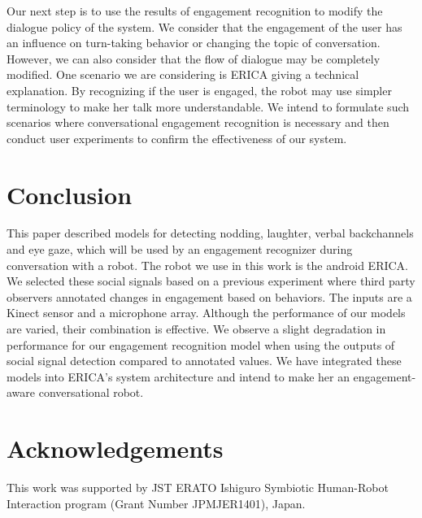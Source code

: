 \documentclass[letterpaper]{article} %
\begin{document}
Our next step is to use the results of engagement recognition to modify the dialogue policy of the system. We consider that the engagement of the user has an influence on turn-taking behavior or changing the topic of conversation. However, we can also consider that the flow of dialogue may be completely modified. One scenario we are considering is ERICA giving a technical explanation. By recognizing if the user is engaged, the robot may use simpler terminology to make her talk more understandable. We intend to formulate such scenarios where conversational engagement recognition is necessary and then conduct user experiments to confirm the effectiveness of our system.

\vspace{-0.90mm}
\vspace{-1.52mm}
\section{Conclusion}
This paper described models for detecting nodding, laughter, verbal backchannels and eye gaze, which will be used by an engagement recognizer during conversation with a robot. The robot we use in this work is the android ERICA. We selected these social signals based on a previous experiment where third party observers annotated changes in engagement based on behaviors. The inputs are a Kinect sensor and a microphone array. Although the performance of our models are varied, their combination is effective. We observe a slight degradation in performance for our engagement recognition model when using the outputs of social signal detection compared to annotated values. We have integrated these models into ERICA's system architecture and intend to make her an engagement-aware conversational robot.

\section{Acknowledgements}
This work was supported by JST ERATO Ishiguro Symbiotic Human-Robot Interaction program (Grant Number JPMJER1401), Japan.
\end{document}
